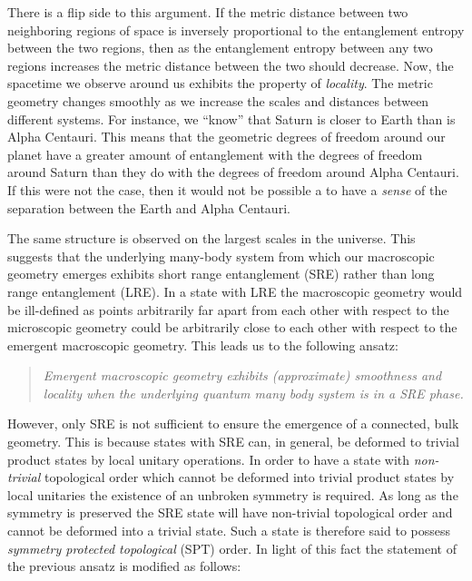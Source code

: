 \documentclass[preprint]{SciPost}
\theoremstyle{plain} %
\begin{document}
There is a flip side to this argument. If the metric distance between two neighboring regions of space is inversely proportional to the entanglement entropy between the two regions, then as the entanglement entropy between any two regions increases the metric distance between the two should decrease. Now, the spacetime we observe around us exhibits the property of \emph{locality}. The metric geometry changes smoothly as we increase the scales and distances between different systems. For instance, we ``know'' that Saturn is closer to Earth than is Alpha Centauri. This means that the geometric degrees of freedom around our planet have a greater amount of entanglement with the degrees of freedom around Saturn than they do with the degrees of freedom around Alpha Centauri. If this were not the case, then it would not be possible a to have a \emph{sense} of the separation between the Earth and Alpha Centauri.

The same structure is observed on the largest scales in the universe. This suggests that the underlying many-body system from which our macroscopic geometry emerges exhibits short range entanglement (SRE) rather than long range entanglement (LRE). In a state with LRE the macroscopic geometry would be ill-defined as points arbitrarily far apart from each other with respect to the microscopic geometry could be arbitrarily close to each other with respect to the emergent macroscopic geometry. This leads us to the following ansatz:

\noindent\begin{minipage}{\linewidth}
	\centering
	\begin{quote}
		\emph{Emergent macroscopic geometry exhibits (approximate) smoothness and locality when the underlying quantum many body system is in a SRE phase.}
	\end{quote}
\end{minipage}

However, only SRE is not sufficient to ensure the emergence of a connected, bulk geometry. This is because states with SRE can, in general, be deformed to trivial product states by local unitary operations. In order to have a state with \emph{non-trivial} topological order which cannot be deformed into trivial product states by local unitaries the existence of an unbroken symmetry is required. As long as the symmetry is preserved the SRE state will have non-trivial topological order and cannot be deformed into a trivial state. Such a state is therefore said to possess \emph{symmetry protected topological} (SPT) order. In light of this fact the statement of the previous ansatz is modified as follows:
\end{document}
